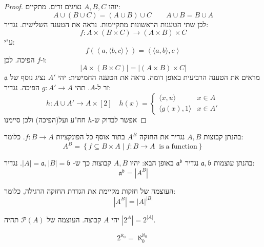 \documentclass{tstextbook}
\begin{document}
\begin{proof}
יוהו \(A,B,C\) נציגים זרים. מתקיים:
$$A\cup\left( B\cup C \right)=\left( A\cup B \right)\cup C\qquad A\cup B=B\cup A$$
לכן שתי הטענות הראשונות מתקיימות. נראה את הטענה השלישית. נגדיר:
$$f:A\times\left( B\times C \right)\to \left( A\times B \right)\times C$$
ע"י:
$$f\left( \left\langle  a,\langle b,c \rangle   \right\rangle  \right)=\left\langle  \langle a,b \rangle ,c  \right\rangle $$
ו-\(f\) הפיכה. לכן:
$$\left\lvert  A\times\left( B\times C \right)  \right\rvert =\left\lvert  \left( A\times B \right)\times C  \right\rvert $$
מראים את הטענה הרביעית באופן דומה. נראה את הטענה החמישית:
יהי \(A'\) נציג נוסף של \(\mathfrak{a}\) זר ל-\(A\). תהי \(g:A'\to A\) הפיכה. נגדיר:
$$h:A\cup A' \to A \times[2]\quad h(x)=\begin{cases}\langle x,u \rangle  & x \in A \\\langle g(x),1 \rangle  & x \in A'
\end{cases}$$
אפשר לבדוק ש-\(h\) חח"ע ועל(הפיכה) ולכן סיימנו

\end{proof}
\begin{definition}
בהנתן קבוצות \(A,B\) נגדיר את החזקה \(A^{ B}\) בתור אוסף כל הפונקציות \(f:B\to A\). כלומר:
$$A^{B}=\left\{ f\subseteq B\times A\mid f:B\to A\;\;\mathrm{is\;a\;function} \right\}$$

\end{definition}
\begin{definition}
בהנתן עוצמות \(\mathfrak{a,b}\) נגדיר \(\mathfrak{a^b}\) באופן הבא:
יהיו \(A,B\) קבוצות כך ש- \(|A|=\mathfrak{a},|B|=\mathfrak{b}\). נגדיר:
$$\mathfrak{a} ^{\mathfrak{b} }=|A^{B}|$$

\end{definition}
\begin{proposition}
העוצמה של חזקות מקיימת את הגדרת החזקה הרגילה, כלומר:
$$|A^{B}|=|A|^{|B|}$$

\end{proposition}
\begin{proposition}
יהי \(A\) קבוצה. העוצמה של \(\mathcal{P}(A)\) תהיה \(|2^{A}|=2^{|A|}\).

\end{proposition}
\begin{proposition}
$$2^{\aleph_{0}}=\aleph_{0}^{\aleph_{0}}$$

\end{proposition}
\end{document}
